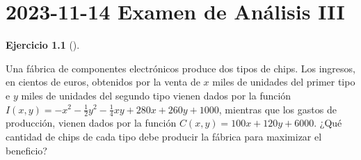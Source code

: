 \documentclass[
  a4paper,
]{scrreport}
\theoremstyle{definition}
\newtheorem{exercise}{Ejercicio}[chapter]
\theoremstyle{remark}
\begin{document}
\chapter{\texorpdfstring{2023-11-14 Examen de Análisis
III}{2023-11-14  Examen de Análisis III}}\label{examen-de-anuxe1lisis-iii}

\begin{exercise}[]\protect\hypertarget{exr-1}{}\label{exr-1}

Una fábrica de componentes electrónicos produce dos tipos de chips. Los
ingresos, en cientos de euros, obtenidos por la venta de \(x\) miles de
unidades del primer tipo e \(y\) miles de unidades del segundo tipo
vienen dados por la función
\(I(x,y) = -x^2-\frac{1}{2}y^2-\frac{1}{4}xy+280x+260y+1000\), mientras
que los gastos de producción, vienen dados por la función
\(C(x,y) = 100x+120y+6000\). ¿Qué cantidad de chips de cada tipo debe
producir la fábrica para maximizar el beneficio?

\end{exercise}
\end{document}
